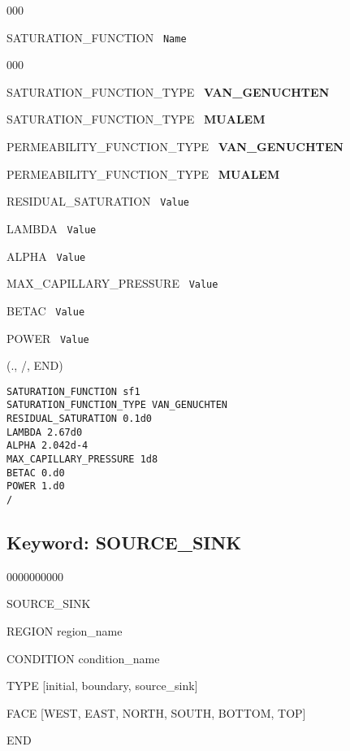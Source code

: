 \documentclass[12pt]{article}
\begin{document}
\begin{deflist}{000}
\item[SATURATION\_FUNCTION] \ {\tt Name}

\begin{deflist}{000}
\item[SATURATION\_FUNCTION\_TYPE] \ {\bf VAN\_GENUCHTEN}
\item[SATURATION\_FUNCTION\_TYPE] \ {\bf MUALEM}
\item[PERMEABILITY\_FUNCTION\_TYPE] \ {\bf VAN\_GENUCHTEN}
\item[PERMEABILITY\_FUNCTION\_TYPE] \ {\bf MUALEM}
\item[RESIDUAL\_SATURATION] \ {\tt Value}
\item[LAMBDA] \ {\tt Value}
\item[ALPHA] \ {\tt Value}
\item[MAX\_CAPILLARY\_PRESSURE] \ {\tt Value}
\item[BETAC] \ {\tt Value}
\item[POWER] \ {\tt Value}
\end{deflist}
\item[(., /, END)]
\end{deflist}


\begin{verbatim}
SATURATION_FUNCTION sf1
SATURATION_FUNCTION_TYPE VAN_GENUCHTEN
RESIDUAL_SATURATION 0.1d0
LAMBDA 2.67d0
ALPHA 2.042d-4
MAX_CAPILLARY_PRESSURE 1d8
BETAC 0.d0
POWER 1.d0
/
\end{verbatim}


\newpage
\protect\hypertarget{target_src}{}

\subsection{Keyword: SOURCE\_SINK}
\begin{deflist}{0000000000}
\item[SOURCE\_SINK]
\item  REGION region\_name
\item  CONDITION condition\_name
\item  TYPE [initial, boundary, source\_sink]
\item  FACE [WEST, EAST, NORTH, SOUTH, BOTTOM, TOP]
\item END
\end{deflist}
\end{document}
